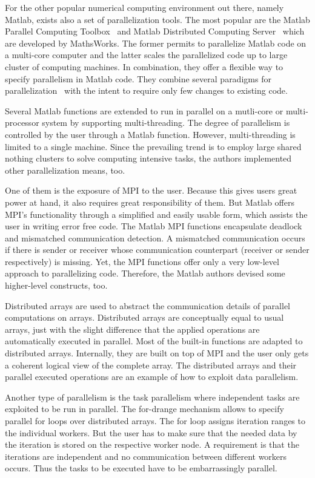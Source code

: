 For the other popular numerical computing environment out there, namely Matlab, exists also a set of parallelization tools.
The most popular are the Matlab Parallel Computing Toolbox~\cite{parallelComputingToolbox} and Matlab Distributed Computing Server~\cite{distributedComputingServer} which are developed by MathsWorks.
The former permits to parallelize Matlab code on a multi-core computer and the latter scales the parallelized code up to large cluster of computing machines.
In combination, they offer a flexible way to specify parallelism in Matlab code.
They combine several paradigms for parallelization~\cite{sharma:ijpp2009a} with the intent to require only few changes to existing code.

Several Matlab functions are extended to run in parallel on a mutli-core or multi-processor system by supporting multi-threading.
The degree of parallelism is controlled by the user through a Matlab function.
However, multi-threading is limited to a single machine.
Since the prevailing trend is to employ large shared nothing clusters to solve computing intensive tasks, the authors implemented other parallelization means, too.

One of them is the exposure of MPI to the user.
Because this gives users great power at hand, it also requires great responsibility of them.
But Matlab offers MPI's functionality through a simplified and easily usable form, which assists the user in writing error free code.
The Matlab MPI functions encapsulate deadlock and mismatched communication detection.
A mismatched communication occurs if there is sender or receiver whose communication counterpart (receiver or sender respectively) is missing.
Yet, the MPI functions offer only a very low-level approach to parallelizing code.
Therefore, the Matlab authors devised some higher-level constructs, too.

Distributed arrays are used to abstract the communication details of parallel computations on arrays.
Distributed arrays are conceptually equal to usual arrays, just with the slight difference that the applied operations are automatically executed in parallel.
Most of the built-in functions are adapted to distributed arrays.
Internally, they are built on top of MPI and the user only gets a coherent logical view of the complete array.
The distributed arrays and their parallel executed operations are an example of how to exploit data parallelism.

Another type of parallelism is the task parallelism where independent tasks are exploited to be run in parallel.
The for-drange mechanism allows to specify parallel for loops over distributed arrays.
The for loop assigns iteration ranges to the individual workers.
But the user has to make sure that the needed data by the iteration is stored on the respective worker node.
A requirement is that the iterations are independent and no communication between different workers occurs.
Thus the tasks to be executed have to be embarrassingly parallel.

